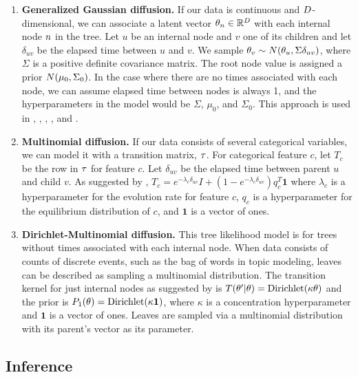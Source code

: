 \begin{enumerate}
    \item \textbf{Generalized Gaussian diffusion.} If our data
    is continuous and $D$-dimensional, we can associate
    a latent vector $\theta_n \in \mathbb{R}^D$ with each internal node
    $n$ in the tree. Let $u$ be an internal node
    and $v$ one of its children and
    let $\delta_{uv}$ be the elapsed time between $u$ and $v$.
    We sample $\theta_v \sim N(\theta_u, \Sigma\delta_{uv})$,
    where $\Sigma$ is a positive definite covariance matrix.
    The root node value is assigned a prior
    $N(\mu_0, \Sigma_0)$.
    In the case where there are no times associated with each node,
    we can assume elapsed time between nodes is always 1,
    and the hyperparameters in the model would be
    $\Sigma$, $\mu_0$, and $\Sigma_0$.
    This approach is used in \citet{Neal2003}, \citet{Teh2008}, \citet{Knowles2015},
    \citet{Adams2010}, \citet{Boyles2012} and \citet{Hu2013}.
    \item \textbf{Multinomial diffusion.} If our data
    consists of several categorical variables, 
    we can model it with a transition matrix, $\tau$.
    For categorical feature $c$, let $T_c$ 
    be the row in $\tau$ for feature $c$.
    Let $\delta_{uv}$ be the elapsed time between parent $u$ and child $v$.
    As suggested by
    \citet{Teh2008},
    $T_{c} = e^{-\lambda_{c}\delta_{uv}}I + (1 -  e^{-\lambda_{c}\delta_{uv}})q_{c}^T\bm{1}$
    where $\lambda_{c}$ is a hyperparameter for the evolution rate for feature 
    $c$, $q_{c}$ is a hyperparameter for the equilibrium
    distribution of $c$, and $\bm{1}$ is a vector of ones.
    \item \textbf{Dirichlet-Multinomial diffusion.}
    This tree likelihood model is for
    trees without times associated with each internal node.
    When data consists of counts of discrete events,
    such as the bag of words in topic modeling,
    leaves can be described as sampling
    a multinomial distribution.
    The transition kernel for
    just internal nodes as suggested by \citet{Adams2010} is $T(\theta' | \theta) = \text{Dirichlet}(\kappa\theta)$
    and the prior is $P_1(\theta) = \text{Dirichlet}(\kappa\bm{1})$,
    where $\kappa$ is a concentration hyperparameter and $\bm{1}$ is a
    vector of ones.
    Leaves are sampled via a multinomial distribution
    with its parent's vector as its parameter.
\end{enumerate}

\subsection{Inference}

